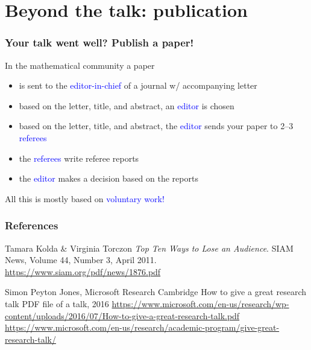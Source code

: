 \documentclass[aspectratio=43,10pt,ucs]{beamer} %
\newcommand{\backupbegin}{
   \newcounter{framenumberappendix}
   \setcounter{framenumberappendix}{\value{framenumber}}
}
\newcommand{\backupend}{
   \addtocounter{framenumberappendix}{-\value{framenumber}}
   \addtocounter{framenumber}{\value{framenumberappendix}} 
}
\begin{document}
\section{Beyond the talk: publication}
\begin{frame}
  \frametitle{Your talk went well? Publish a paper!}

  In the mathematical community a paper
  \begin{itemize}[<+->]
  \item is sent to the \textcolor{blue}{editor-in-chief} of a journal
    w/ \alert{accompanying letter}
  \item based on the \alert{letter, title, and abstract}, an
    \textcolor{blue}{editor} is chosen
  \item based on the \alert{letter, title, and abstract}, the
    \textcolor{blue}{editor} sends your paper to 2--3
    \textcolor{blue}{referees}
  \item the \textcolor{blue}{referees} write referee reports
  \item the \textcolor{blue}{editor} makes a decision based on the
    reports
  \end{itemize}

  \vspace*{1em}

  All this is mostly based on \textcolor{blue}{voluntary work!}

\end{frame}
\appendix
\backupbegin
\begin{frame}
  \frametitle{References}
  
  \begin{thebibliography}{}
    Tamara Kolda \& Virginia Torczon
    \newblock \emph{Top Ten Ways to Lose an Audience}.
    \newblock SIAM News, Volume 44, Number 3, April 2011.
    \newblock \url{https://www.siam.org/pdf/news/1876.pdf}

    Simon Peyton Jones, Microsoft Research Cambridge
    \newblock How to give a great research talk
    \newblock PDF file of a talk, 2016
    \newblock
    \url{https://www.microsoft.com/en-us/research/wp-content/uploads/2016/07/How-to-give-a-great-research-talk.pdf}
    \newblock \url{https://www.microsoft.com/en-us/research/academic-program/give-great-research-talk/}
  \end{thebibliography}

\end{frame}
\backupend
\end{document}
